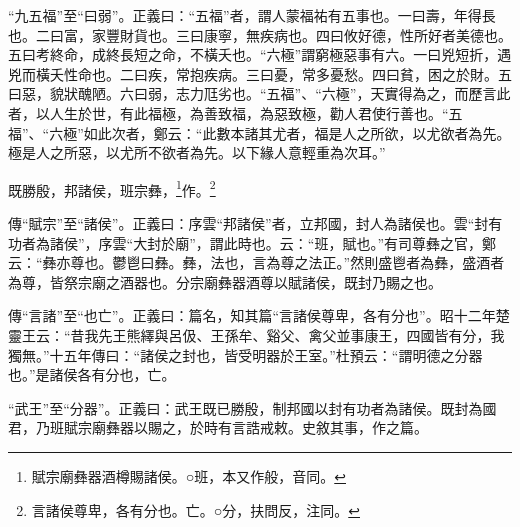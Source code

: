 {\noindent\shu{}\fzkt “九五福”至“曰弱”。正義曰：“五福”者，謂人蒙福祐有五事也。一曰壽，年得長也。二曰富，家豐財貨也。三曰康寧，無疾病也。四曰攸好德，性所好者美德也。五曰考終命，成終長短之命，不橫夭也。“六極”謂窮極惡事有六。一曰兇短折，遇兇而橫夭性命也。二曰疾，常抱疾病。三曰憂，常多憂愁。四曰貧，困之於財。五曰惡，貌狀醜陋。六曰弱，志力尫劣也。“五福”、“六極”，天實得為之，而歷言此者，以人生於世，有此福極，為善致福，為惡致極，勸人君使行善也。“五福”、“六極”如此次者，鄭云：“此數本諸其尤者，福是人之所欲，以尤欲者為先。極是人之所惡，以尤所不欲者為先。以下緣人意輕重為次耳。” \par}

既勝殷，邦諸侯，班宗彝，\footnote{賦宗廟彝器酒樽賜諸侯。○班，本又作般，音同。}作。\footnote{言諸侯尊卑，各有分也。亡。○分，扶問反，注同。}

{\noindent\zhuan{}\fzbyks 傳“賦宗”至“諸侯”。正義曰：序雲“邦諸侯”者，立邦國，封人為諸侯也。雲“封有功者為諸侯”，序雲“大封於廟”，謂此時也。云：“班，賦也。”有司尊彝之官，鄭云：“彝亦尊也。鬱鬯曰彝。彝，法也，言為尊之法正。”然則盛鬯者為彝，盛酒者為尊，皆祭宗廟之酒器也。分宗廟彝器酒尊以賦諸侯，既封乃賜之也。 \par}

{\noindent\zhuan{}\fzbyks 傳“言諸”至“也亡”。正義曰：篇名，知其篇“言諸侯尊卑，各有分也”。昭十二年楚靈王云：“昔我先王熊繹與呂伋、王孫牟、谿父、禽父並事康王，四國皆有分，我獨無。”十五年傳曰：“諸侯之封也，皆受明器於王室。”杜預云：“謂明德之分器也。”是諸侯各有分也，亡。 \par}

{\noindent\shu{}\fzkt “武王”至“分器”。正義曰：武王既已勝殷，制邦國以封有功者為諸侯。既封為國君，乃班賦宗廟彝器以賜之，於時有言誥戒敕。史敘其事，作之篇。 \par}

